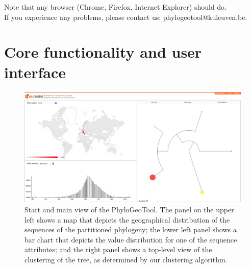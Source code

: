 \documentclass[a4paper, 11pt]{article} %
\begin{document}
Note that any browser (Chrome, Firefox, Internet Explorer) should do.\\

\noindent If you experience any problems, please contact us: phylogeotool@kuleuven.be.


\section{Core functionality and user interface}
\label{sec:core_func_user_interface}
\begin{figure}[H]
\centering
\includegraphics[scale=0.1875]{images/defaultScreenshot.png}
\vspace{-0.75cm}
\caption{Start and main view of the PhyloGeoTool. 
The panel on the upper left shows a map that depicts the geographical distribution of the sequences of the partitioned phylogeny; the lower left panel shows a bar chart that depicts the value distribution for one of the sequence attributes; and the right panel shows a top-level view of the clustering of the tree, as determined by our clustering algorithm. %
}
\label{fig:initialview}
\end{figure}
\end{document}
